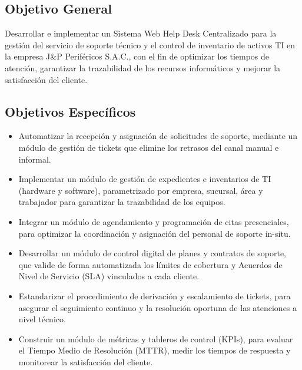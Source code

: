 \subsection{Objetivo General}

Desarrollar e implementar un Sistema Web Help Desk Centralizado para la gestión del servicio de soporte técnico y el control de inventario de activos TI en la empresa J\&P Periféricos S.A.C., con el fin de optimizar los tiempos de atención, garantizar la trazabilidad de los recursos informáticos y mejorar la satisfacción del cliente.

\vspace{0.8em}

\subsection{Objetivos Específicos}

\begin{itemize}[leftmargin=1.27cm]
 \item Automatizar la recepción y asignación de solicitudes de soporte, mediante un módulo de gestión de tickets que elimine los retrasos del canal manual e informal.
 
 \item Implementar un módulo de gestión de expedientes e inventarios de TI (hardware y software), parametrizado por empresa, sucursal, área y trabajador para garantizar la trazabilidad de los equipos.
 
 \item Integrar un módulo de agendamiento y programación de citas presenciales, para optimizar la coordinación y asignación del personal de soporte in-situ.
 
 \item Desarrollar un módulo de control digital de planes y contratos de soporte, que valide de forma automatizada los límites de cobertura y Acuerdos de Nivel de Servicio (SLA) vinculados a cada cliente.
 
 \item Estandarizar el procedimiento de derivación y escalamiento de tickets, para asegurar el seguimiento continuo y la resolución oportuna de las atenciones a nivel técnico.
 
 \item Construir un módulo de métricas y tableros de control (KPIs), para evaluar el Tiempo Medio de Resolución (MTTR), medir los tiempos de respuesta y monitorear la satisfacción del cliente.
\end{itemize}


